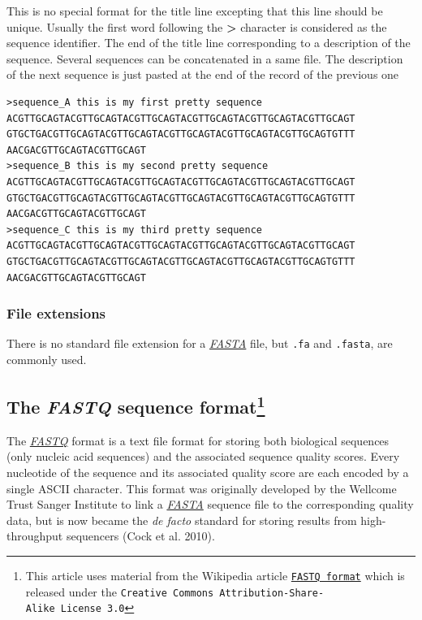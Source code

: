 \documentclass[
  letterpaper,
  DIV=11,
  numbers=noendperiod]{scrreprt}
\begin{document}
This is no special format for the title line excepting that this line
should be unique. Usually the first word following the
\textbf{\textgreater{}} character is considered as the sequence
identifier. The end of the title line corresponding to a description of
the sequence. Several sequences can be concatenated in a same file. The
description of the next sequence is just pasted at the end of the record
of the previous one

\begin{verbatim}
>sequence_A this is my first pretty sequence
ACGTTGCAGTACGTTGCAGTACGTTGCAGTACGTTGCAGTACGTTGCAGTACGTTGCAGT
GTGCTGACGTTGCAGTACGTTGCAGTACGTTGCAGTACGTTGCAGTACGTTGCAGTGTTT
AACGACGTTGCAGTACGTTGCAGT
>sequence_B this is my second pretty sequence
ACGTTGCAGTACGTTGCAGTACGTTGCAGTACGTTGCAGTACGTTGCAGTACGTTGCAGT
GTGCTGACGTTGCAGTACGTTGCAGTACGTTGCAGTACGTTGCAGTACGTTGCAGTGTTT
AACGACGTTGCAGTACGTTGCAGT
>sequence_C this is my third pretty sequence
ACGTTGCAGTACGTTGCAGTACGTTGCAGTACGTTGCAGTACGTTGCAGTACGTTGCAGT
GTGCTGACGTTGCAGTACGTTGCAGTACGTTGCAGTACGTTGCAGTACGTTGCAGTGTTT
AACGACGTTGCAGTACGTTGCAGT
\end{verbatim}

\hypertarget{file-extensions}{%
\subsubsection{File extensions}\label{file-extensions}}

There is no standard file extension for a
\protect\hyperlink{sec-fasta}{\emph{FASTA}} file, but \texttt{.fa} and
\texttt{.fasta}, are commonly used.

\hypertarget{sec-fastq}{%
\subsection[The \emph{FASTQ} sequence format]{\texorpdfstring{The
\emph{FASTQ} sequence
format\footnote{This article uses material from the Wikipedia article
  \href{http://en.wikipedia.org/wiki/FASTQ_format}{\texttt{FASTQ\ format}}
  which is released under the
  \texttt{Creative\ Commons\ Attribution-Share-Alike\ License\ 3.0}}}{The FASTQ sequence format}}\label{sec-fastq}}

The \protect\hyperlink{sec-fastq}{\emph{FASTQ}} format is a text file
format for storing both biological sequences (only nucleic acid
sequences) and the associated sequence quality scores. Every nucleotide
of the sequence and its associated quality score are each encoded by a
single ASCII character. This format was originally developed by the
Wellcome Trust Sanger Institute to link a
\protect\hyperlink{sec-fasta}{\emph{FASTA}} sequence file to the
corresponding quality data, but is now became the \emph{de facto}
standard for storing results from high-throughput sequencers (Cock et
al. 2010).
\end{document}
